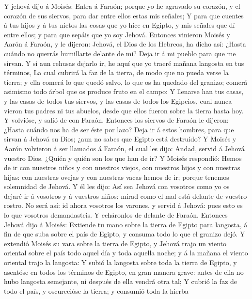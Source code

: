  Y jehová dijo á Moisés: Entra á Faraón; porque yo he
agravado su corazón, y el corazón de sus siervos, para dar entre ellos
estas mis señales;  Y para que cuentes á tus hijos y á tus
nietos las cosas que yo hice en Egipto, y mis señales que dí entre
ellos; y para que sepáis que yo soy Jehová.  Entonces
vinieron Moisés y Aarón á Faraón, y le dijeron: Jehová, el Dios de los
Hebreos, ha dicho así: ¿Hasta cuándo no querrás humillarte delante de
mí? Deja ir á mi pueblo para que me sirvan.  Y si aun
rehusas dejarlo ir, he aquí que yo traeré mañana langosta en tus
términos,  La cual cubrirá la faz de la tierra, de modo que
no pueda verse la tierra; y ella comerá lo que quedó salvo, lo que os ha
quedado del granizo; comerá asimismo todo árbol que os produce fruto en
el campo:  Y llenarse han tus casas, y las casas de todos
tus siervos, y las casas de todos los Egipcios, cual nunca vieron tus
padres ni tus abuelos, desde que ellos fueron sobre la tierra hasta hoy.
Y volvióse, y salió de con Faraón.  Entonces los siervos de
Faraón le dijeron: ¿Hasta cuándo nos ha de ser éste por lazo? Deja ir á
estos hombres, para que sirvan á Jehová su Dios; ¿aun no sabes que
Egipto está destruído?  Y Moisés y Aarón volvieron á ser
llamados á Faraón, el cual les dijo: Andad, servid á Jehová vuestro
Dios. ¿Quién y quién son los que han de ir?  Y Moisés
respondió: Hemos de ir con nuestros niños y con nuestros viejos, con
nuestros hijos y con nuestras hijas: con nuestras ovejas y con nuestras
vacas hemos de ir; porque tenemos solemnidad de Jehová.  Y
él les dijo: Así sea Jehová con vosotros como yo os dejaré ir á vosotros
y á vuestros niños: mirad como el mal está delante de vuestro rostro.
 No será así: id ahora vosotros los varones, y servid á
Jehová: pues esto es lo que vosotros demandasteis. Y echáronlos de
delante de Faraón.  Entonces Jehová dijo á Moisés: Extiende
tu mano sobre la tierra de Egipto para langosta, á fin de que suba sobre
el país de Egipto, y consuma todo lo que el granizo dejó. 
Y extendió Moisés su vara sobre la tierra de Egipto, y Jehová trajo un
viento oriental sobre el país todo aquel día y toda aquella noche; y á
la mañana el viento oriental trajo la langosta:  Y subió la
langosta sobre toda la tierra de Egipto, y asentóse en todos los
términos de Egipto, en gran manera grave: antes de ella no hubo langosta
semejante, ni después de ella vendrá otra tal;  Y cubrió la
faz de todo el país, y oscurecióse la tierra; y consumió toda la hierba

